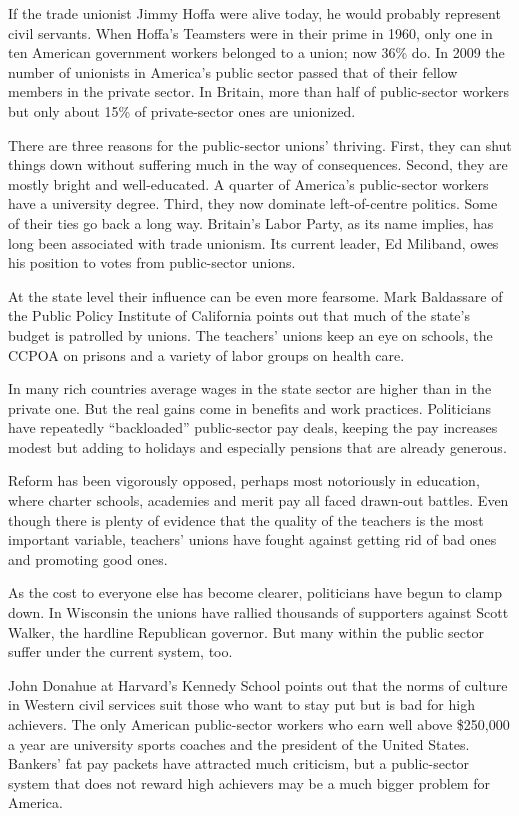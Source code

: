If the trade unionist Jimmy Hoffa were alive today, he would probably represent civil servants. When Hoffa's Teamsters were in their prime in 1960, only one in ten American government workers belonged to a union; now 36\% do. In 2009 the number of unionists in America's public sector passed that of their fellow members in the private sector. In Britain, more than half of public-sector workers but only about 15\% of private-sector ones are unionized.


There are three reasons for the public-sector unions' thriving. First, they can shut things down without suffering much in the way of consequences. Second, they are mostly bright and well-educated. A quarter of America's public-sector workers have a university degree. Third, they now dominate left-of-centre politics. Some of their ties go back a long way. Britain's Labor Party, as its name implies, has long been associated with trade unionism. Its current leader, Ed Miliband, owes his position to votes from public-sector unions.


At the state level their influence can be even more fearsome. Mark Baldassare of the Public Policy Institute of California points out that much of the state's budget is patrolled by unions. The teachers' unions keep an eye on schools, the CCPOA on prisons and a variety of labor groups on health care.


In many rich countries average wages in the state sector are higher than in the private one. But the real gains come in benefits and work practices. Politicians have repeatedly ``backloaded'' public-sector pay deals, keeping the pay increases modest but adding to holidays and especially pensions that are already generous.


Reform has been vigorously opposed, perhaps most notoriously in education, where charter schools, academies and merit pay all faced drawn-out battles. Even though there is plenty of evidence that the quality of the teachers is the most important variable, teachers' unions have fought against getting rid of bad ones and promoting good ones.


As the cost to everyone else has become clearer, politicians have begun to clamp down. In Wisconsin the unions have rallied thousands of supporters against Scott Walker, the hardline Republican governor. But many within the public sector suffer under the current system, too.


John Donahue at Harvard's Kennedy School points out that the norms of culture in Western civil services suit those who want to stay put but is bad for high achievers. The only American public-sector workers who earn well above \$250,000 a year are university sports coaches and the president of the United States. Bankers' fat pay packets have attracted much criticism, but a public-sector system that does not reward high achievers may be a much bigger problem for America.